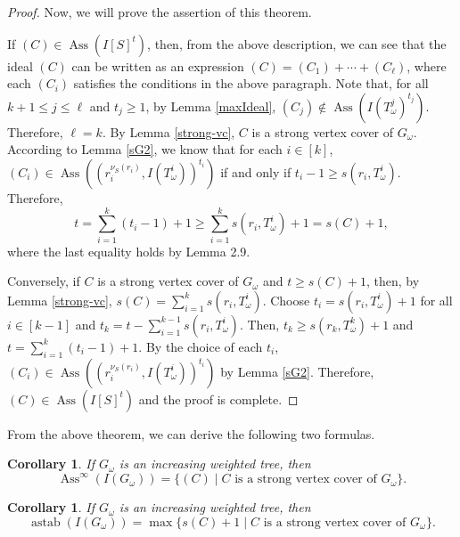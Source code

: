 \documentclass[12pt,amscd]{amsart}
\DeclareMathOperator{\ass}{Ass}
\DeclareMathOperator{\astab}{astab}
\newtheorem{cor}[thm]{Corollary}
\theoremstyle{definition}
\begin{document}
\begin{proof}
Now, we will prove the assertion of this theorem.
	
If $(C)\in \ass(I[S]^t)$,  then, from the above description, we can see that the ideal $(C)$ can be written as an expression $(C)=(C_1)+\cdots +(C_\ell)$, where each $(C_i)$ satisfies the conditions in the above paragraph.
Note that, for  all $k+1\le j\le \ell$ and  $t_j\geqslant 1$, by Lemma \ref{maxIdeal},  $(C_j)\notin \ass(I(T^j_\omega)^{t_j})$. Therefore,  $\ell=k$.  By Lemma \ref{strong-vc},
$C$ is a strong vertex cover  of $G_\omega$. According to Lemma \ref{sG2}, we know that  for each $i\in[k]$,  $(C_i)\in \ass((r_i^{\nu_S(r_i)},I(T^i_\omega))^{t_i})$ if and only if $t_i-1\geqslant s(r_i,T^i_\omega)$. Therefore, 
\[
t=\sum_{i=1}^{k} (t_i-1) + 1 \geqslant \sum_{i=1}^{k} s(r_i,T^i_\omega)+1 = s(C)+1,
\]
where the last   equality holds by Lemma 2.9.

Conversely, if $C$ is a strong vertex cover of $G_\omega$ and $t \geqslant s(C)+1$, then,   by  Lemma \ref{strong-vc}, $s(C)=\sum\limits_{i=1}^{k} s(r_i,T^i_\omega)$.
Choose $t_i=s(r_i,T^i_\omega)+1$ for all $i\in[k-1]$ and $t_k=t-\sum\limits_{i=1}^{k-1}s(r_i,T^i_\omega)$. Then, $t_k\geqslant s(r_k,T^k_\omega)+1$ and $t=\sum\limits_{i=1}^{k}(t_i-1)+1$. By the choice of each $t_i$,
$(C_i)\in \ass((r_i^{\nu_S(r_i)}, I(T^i_\omega))^{t_i})$ by Lemma \ref{sG2}. Therefore, $(C)\in \ass(I[S]^t)$ and the proof is complete.
\end{proof}

From  the above theorem, we can derive the following two formulas.

\begin{cor} \label{Infinity} If $G_\omega$ is an increasing weighted tree, then
$$\ass^{\infty}(I(G_\omega)) = \{(C)\mid C \text{ is a strong vertex cover of $G_\omega$}\}.$$
\end{cor}


\begin{cor}\label{main-corr} If $G_\omega$ is an increasing weighted tree, then
$$\astab(I(G_\omega)) = \max\{s(C)+1\mid C \text{ is a strong vertex cover of } G_\omega\}.$$
\end{cor}
\end{document}
